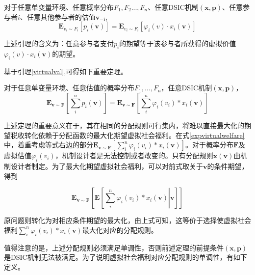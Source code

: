 \documentclass[promaster]{thesis-uestc}
\begin{document}
\begin{lemma}
\label{virtualval}
    对于任意单变量环境、任意概率分布$F_1,F_2...,F_n$、任意DSIC机制$(\mathbf{x},\mathbf{p})$、任意参与者$i$、任意其他参与者的估值$\mathbf{v_{-i}}$,
    \begin{equation}
       \mathbf{E}_{v_i\sim F_i}[p_i(\mathbf{v})]= \mathbf{E}_{v_i\sim F_i}[\varphi_i(v)\cdot x_i(\mathbf{v})]
    \end{equation}
\end{lemma}

上述引理的含义为：任意参与者支付$p_i$的期望等于该参与者所获得的虚拟价值$\varphi_i(v)\cdot x_i(\mathbf{v})$的期望。

基于引理\ref{virtualval},可得如下重要定理。

\begin{theorem}[期望税收等于期望虚拟社会福利]
    对于任意单变量环境、任意估值的概率分布$F_1,...,F_n$，任意DSIC机制$(\mathbf{x},\mathbf{p})$，
    \begin{equation}
    \label{expvirtualwelfare}
    \mathbf{E}_{\mathbf{v}\sim\mathbf{F}}{\left[\sum_{i}^{n}{p_i(\mathbf{v})}\right]}=\mathbf{E}_{\mathbf{v}\sim\mathbf{F}}{\left[\sum_{i}^{n}{\varphi _i(v_i)*x_i(\mathbf{v})}\right]}
    \end{equation}
\end{theorem}

上述定理的重要意义在于，其在相同的分配规则可行集内，将难以直接最大化的期望税收转化依赖于分配函数的最大化期望虚拟社会福利。在式\ref{expvirtualwelfare}中，着重考虑等式右边的部分$\mathbf{E}_{\mathbf{v}\sim\mathbf{F}}{\left[\sum_{i}^{n}{\varphi _i(v_i)*x_i(\mathbf{v})}\right]}$。对于概率分布$\mathbf{F}$及虚拟估值$\varphi_i(v_i)$，机制设计者是无法控制或者改变的。只有分配规则$\mathbf{x(v)}$由机制设计者制定。为了最大化期望虚拟社会福利，可以对前式取关于$\mathbf{v}$的条件期望，得到

\begin{equation}
\mathbf{E}_{\mathbf{v}\sim\mathbf{F}}{\left[\mathbf{E}\left[\left.\sum_{i}^{n}{\varphi _i(v_i)*x_i(\mathbf{v})}\right|\mathbf{v}\right]\right]}
\end{equation}

原问题则转化为对相应条件期望的最大化，由上式可知，这等价于选择使虚拟社会福利$\sum_{i}^{n}{\varphi _i(v_i)*x_i(\mathbf{v})}$最大化对应的分配规则。

值得注意的是，上述分配规则必须满足单调性，否则前述定理的前提条件$(\mathbf{x},\mathbf{p})$是DSIC机制无法被满足。为了说明虚拟社会福利对应分配规则的单调性，有如下定义。
\end{document}
